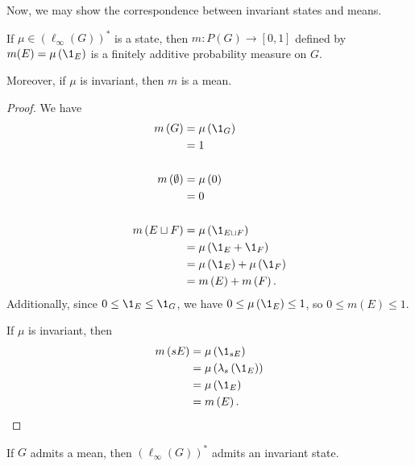Now, we may show the correspondence between invariant states and means.
\begin{proposition}\label{prop:state_implies_mean}
  If $\mu\in \left(\ell_{\infty}\left(G\right)\right)^{\ast}$ is a state, then $m\colon P(G)\rightarrow [0,1]$ defined by $m(E) = \mu\left(\1_{E}\right)$ is a finitely additive probability measure on $G$.\newline

  Moreover, if $\mu$ is invariant, then $m$ is a mean.
\end{proposition}
\begin{proof}
  We have
  \begin{align*}
    m\left(G\right) &= \mu\left(\1_{G}\right)\\
                    &= 1\\
                    \\
    m\left(\emptyset\right) &= \mu\left(0\right)\\
                            &= 0\\
                            \\
    m\left(E\sqcup F\right) &= \mu\left(\1_{E\sqcup F}\right)\\
                            &= \mu\left(\1_{E} + \1_{F}\right)\\
                            &= \mu\left(\1_{E}\right) + \mu\left(\1_{F}\right)\\
                            &= m\left(E\right) + m\left(F\right).
  \end{align*}
  Additionally, since $0 \leq \1_{E}\leq \1_{G}$, we have $0 \leq \mu\left(\1_{E}\right) \leq 1$, so $0 \leq m(E) \leq 1$.\newline

  If $\mu$ is invariant, then
  \begin{align*}
    m\left(sE\right) &= \mu\left(\1_{sE}\right)\\
                     &= \mu\left(\lambda_s\left(\1_{E}\right)\right)\\
                     &= \mu\left(\1_{E}\right)\\
                     &= m\left(E\right).
  \end{align*}
\end{proof}
\begin{proposition}\label{prop:mean_implies_state}
  If $G$ admits a mean, then $\left(\ell_{\infty}\left(G\right)\right)^{\ast}$ admits an invariant state.
\end{proposition}
